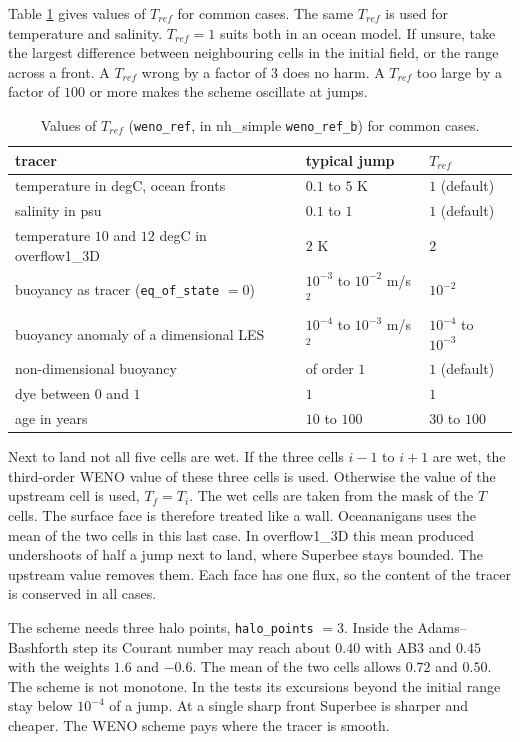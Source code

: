 \documentclass[12pt]{article}
\begin{document}
Table \ref{tab:weno_ref_examples} gives values of $T_{ref}$ for common cases.
The same $T_{ref}$ is used for temperature and salinity.
$T_{ref} = 1$ suits both in an ocean model.
If unsure, take the largest difference between neighbouring cells in the initial field, or the range across a front.
A $T_{ref}$ wrong by a factor of $3$ does no harm.
A $T_{ref}$ too large by a factor of $100$ or more makes the scheme oscillate at jumps.

\begin{table}[h]
\begin{center}
\begin{tabular}{@{}lll@{}}
\hline
tracer & typical jump & $T_{ref}$ \\
\hline
temperature in degC, ocean fronts & $0.1$ to $5$ K & $1$ (default) \\
salinity in psu & $0.1$ to $1$ & $1$ (default) \\
temperature $10$ and $12$ degC in overflow1\_3D & $2$ K & $2$ \\
buoyancy as tracer (\verb|eq_of_state| $=0$) & $10^{-3}$ to $10^{-2}$ m/s$^2$ & $10^{-2}$ \\
buoyancy anomaly of a dimensional LES & $10^{-4}$ to $10^{-3}$ m/s$^2$ & $10^{-4}$ to $10^{-3}$ \\
non-dimensional buoyancy & of order $1$ & $1$ (default) \\
dye between $0$ and $1$ & $1$ & $1$ \\
age in years & $10$ to $100$ & $30$ to $100$ \\
\hline
\end{tabular}
\end{center}
\caption{Values of $T_{ref}$ (\texttt{weno\_ref}, in nh\_simple \texttt{weno\_ref\_b}) for common cases.}
\label{tab:weno_ref_examples}
\end{table}

Next to land not all five cells are wet.
If the three cells $i-1$ to $i+1$ are wet, the third-order WENO value of these three cells is used.
Otherwise the value of the upstream cell is used, $T_f = T_i$.
The wet cells are taken from the mask of the $T$ cells.
The surface face is therefore treated like a wall.
Oceananigans uses the mean of the two cells in this last case.
In overflow1\_3D this mean produced undershoots of half a jump next to land, where Superbee stays bounded.
The upstream value removes them.
Each face has one flux, so the content of the tracer is conserved in all cases.

The scheme needs three halo points, \verb|halo_points| $= 3$.
Inside the Adams--Bashforth step its Courant number may reach about $0.40$ with AB3 and $0.45$ with the weights $1.6$ and $-0.6$.
The mean of the two cells allows $0.72$ and $0.50$.
The scheme is not monotone.
In the tests its excursions beyond the initial range stay below $10^{-4}$ of a jump.
At a single sharp front Superbee is sharper and cheaper.
The WENO scheme pays where the tracer is smooth.
\end{document}
